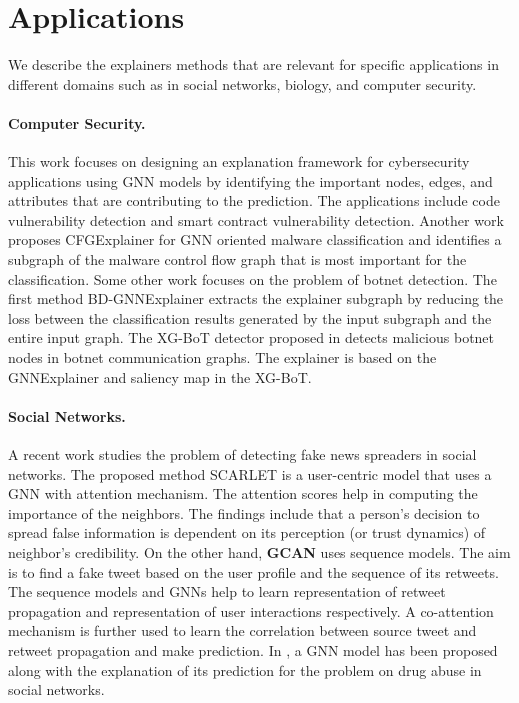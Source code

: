 \section{Applications}
\label{sec:sourav_:application}
We describe the explainers methods that are relevant for specific applications in different domains such as in social networks, biology, and computer security.%



\paragraph{Computer Security.} This work \cite{he2022illuminati} focuses on designing an explanation framework for cybersecurity applications using GNN models by identifying the important nodes, edges, and attributes that are contributing to the prediction. The applications include code vulnerability detection and smart contract vulnerability detection. Another work \cite{herath2022cfgexplainer} proposes CFGExplainer for GNN oriented malware classification and identifies a subgraph of the malware control flow graph that is most important for the classification. Some other work focuses on the problem of botnet detection. The first method BD-GNNExplainer \cite{zhu2022interpretability} extracts the explainer subgraph by reducing the loss between the classification results generated by the input subgraph and the entire input graph. The XG-BoT detector proposed in \cite{lo2023xg} detects malicious botnet nodes in botnet communication graphs. The explainer is based on the GNNExplainer and saliency map in the XG-BoT. %



\paragraph{Social Networks.}A recent work \cite{rath2021scarlet} studies the problem of detecting fake news spreaders in social networks. The proposed method SCARLET is a user-centric model that uses a GNN with attention mechanism. The attention scores help in computing the importance of the neighbors. The findings include that a person’s decision to spread false information is dependent on its perception (or trust dynamics) of neighbor’s credibility. On the other hand, \textbf{GCAN} \cite{GCAN} uses sequence models. The aim is to find a fake tweet based on the user profile and the sequence of its retweets. The sequence models and GNNs help to learn representation of retweet propagation and representation of user interactions respectively. A co-attention mechanism is further used to learn the correlation between source tweet and retweet propagation and make prediction. In \cite{ma2021understanding}, a GNN model has been proposed along with the explanation of its prediction for the problem on drug abuse in social networks.




